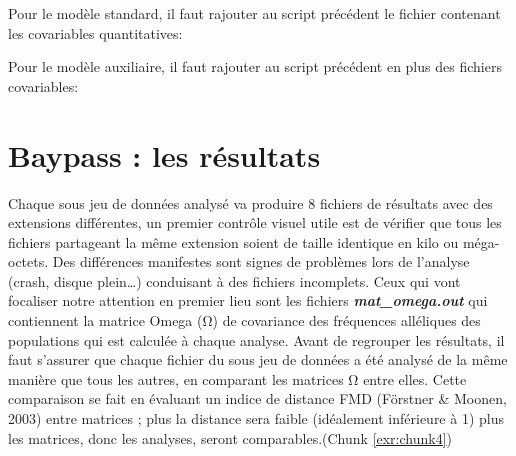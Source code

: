 \documentclass[
  openany]{book}
\newenvironment{Shaded}{\begin{snugshade}}{\end{snugshade}}
\newcommand{\CommentTok}[1]{\textcolor[rgb]{0.56,0.35,0.01}{\textit{#1}}}
\newcommand{\DataTypeTok}[1]{\textcolor[rgb]{0.13,0.29,0.53}{#1}}
\newcommand{\ExtensionTok}[1]{#1}
\newcommand{\NormalTok}[1]{#1}
\newcommand{\VariableTok}[1]{\textcolor[rgb]{0.00,0.00,0.00}{#1}}
\theoremstyle{definition}
\theoremstyle{definition}
\theoremstyle{definition}
\theoremstyle{definition}
\theoremstyle{remark}
\begin{document}
Pour le modèle standard, il faut rajouter au script précédent le fichier contenant les covariables quantitatives:

\begin{Shaded}
\end{Shaded}

Pour le modèle auxiliaire, il faut rajouter au script précédent en plus des fichiers covariables:

\begin{Shaded}
\end{Shaded}

\hypertarget{baypass-les-ruxe9sultats}{%
\chapter*{Baypass : les résultats}\label{baypass-les-ruxe9sultats}}

Chaque sous jeu de données analysé va produire 8 fichiers de résultats avec des extensions différentes, un premier contrôle visuel utile est de vérifier que tous les fichiers partageant la même extension soient de taille identique en kilo ou méga-octets. Des différences manifestes sont signes de problèmes lors de l'analyse (crash, disque plein\ldots) conduisant à des fichiers incomplets. Ceux qui vont focaliser notre attention en premier lieu sont les fichiers \textbf{\emph{mat\_omega.out}} qui contiennent la matrice Omega (Ω) de covariance des fréquences alléliques des populations qui est calculée à chaque analyse. Avant de regrouper les résultats, il faut s'assurer que chaque fichier du sous jeu de données a été analysé de la même manière que tous les autres, en comparant les matrices Ω entre elles.
Cette comparaison se fait en évaluant un indice de distance FMD (Förstner \& Moonen, 2003) entre matrices ; plus la distance sera faible (idéalement inférieure à 1) plus les matrices, donc les analyses, seront comparables.(Chunk \ref{exr:chunk4})
\end{document}
